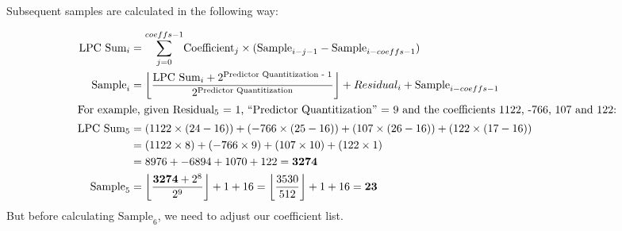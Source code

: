 Subsequent samples are calculated in the following way:

\begin{align*}
\text{LPC Sum}_i &= \overset{coeffs - 1}{\underset{j = 0}{\sum}}
\text{Coefficient}_j \times (\text{Sample}_{i - j - 1} - \text{Sample}_{i - coeffs - 1}) \\
\text{Sample}_i &= \left\lfloor \frac{\text{LPC Sum}_i + 2^{\text{Predictor Quantitization - 1}}} {2 ^ \text{Predictor Quantitization}}\right\rfloor + Residual_i + \text{Sample}_{i - coeffs - 1} \\
\intertext{For example, given $\text{Residual}_5$ = 1,
``{Predictor Quantitization}'' = 9
and the coefficients 1122, -766, 107 and 122:}
\text{LPC Sum}_5 &=
(1122 \times (24 - 16)) + (-766 \times (25 - 16)) +
 (107 \times (26 - 16)) + (122 \times (17 - 16)) \\
&= (1122 \times 8) + (-766 \times 9) + (107 \times 10) + (122 \times 1) \\
&= 8976 + -6894 + 1070 + 122 = \textbf{3274} \\
\text{Sample}_5 &= \left\lfloor\frac{\textbf{3274} + 2^8}{2^9}\right\rfloor + 1 + 16
= \left\lfloor\frac{3530}{512}\right\rfloor + 1 + 16 = \textbf{23}
\end{align*}
But before calculating $\text{Sample}_6$,
we need to adjust our coefficient list.

